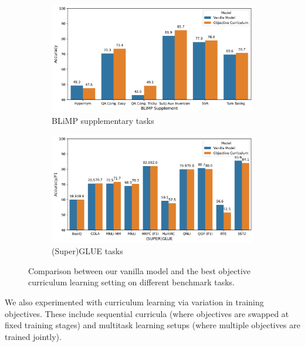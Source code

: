 \begin{figure}[h]
    \centering
    \begin{subfigure}[b]{0.48\textwidth}
        \centering
        \includegraphics[width=\textwidth]{chapters/climb/figures/baseline_vs_obj_cl_blimp_supp_new.png}
        \caption{BLiMP supplementary tasks}
        \label{fig:baseline_obj_cl_blimp_supp}
    \end{subfigure}
    \hfill
    \begin{subfigure}[b]{0.48\textwidth}
        \centering
        \includegraphics[width=\textwidth]{chapters/climb/figures/baseline_vs_obj_cl_superglue.png}
        \caption{(Super)GLUE tasks}
        \label{fig:baseline_obj_cl_superglue}
    \end{subfigure}
    \caption{Comparison between our vanilla model and the best objective curriculum learning setting on different benchmark tasks.}
    \label{fig:baseline_obj_cl_comparison}
    \end{figure}

We also experimented with curriculum learning via variation in training objectives. These include sequential curricula (where objectives are swapped at fixed training stages) and multitask learning setups (where multiple objectives are trained jointly).

